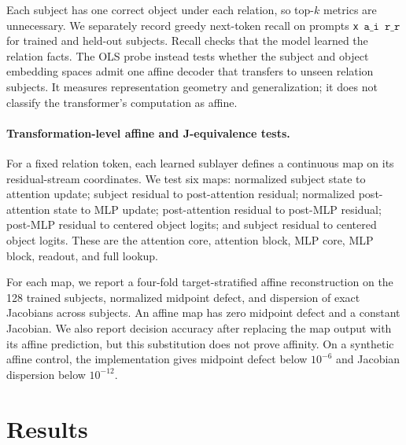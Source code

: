 \documentclass[11pt]{article}
\newcommand{\sep}{\texttt{x}}
\newcommand{\subj}[1]{\texttt{a\_#1}}
\newcommand{\rel}[1]{\texttt{r\_#1}}
\begin{document}
Each subject has one correct object under each relation, so top-$k$ metrics are
unnecessary.  We separately record greedy next-token recall on prompts \sep\
$\subj{i}$\ $\rel{r}$ for trained and held-out subjects.  Recall checks that the
model learned the relation facts.  The OLS probe instead tests whether the subject
and object embedding spaces admit one affine decoder that transfers to unseen
relation subjects.  It measures representation geometry and generalization; it
does not classify the transformer's computation as affine.

\paragraph{Transformation-level affine and J-equivalence tests.}
For a fixed relation token, each learned sublayer defines a continuous map on its
residual-stream coordinates.  We test six maps: normalized subject state to
attention update; subject residual to post-attention residual; normalized
post-attention state to MLP update; post-attention residual to post-MLP residual;
post-MLP residual to centered object logits; and subject residual to centered
object logits.  These are the attention core, attention block, MLP core, MLP block,
readout, and full lookup.

For each map, we report a four-fold target-stratified affine reconstruction on the
128 trained subjects, normalized midpoint defect, and dispersion of exact
Jacobians across subjects.  An affine map has zero midpoint defect and a constant
Jacobian.  We also report decision accuracy after replacing the map output with its
affine prediction, but this substitution does not prove affinity.  On a synthetic
affine control, the implementation gives midpoint defect below $10^{-6}$ and
Jacobian dispersion below $10^{-12}$.

\section{Results}
\end{document}
